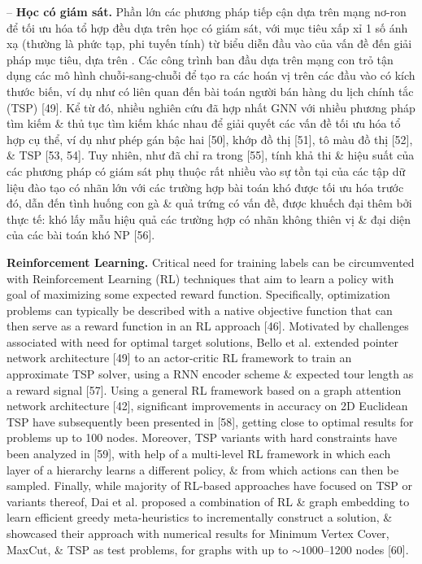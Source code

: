 \documentclass{article}
\begin{document}
\begin{itemize}
    -- {\bf Học có giám sát.} Phần lớn các phương pháp tiếp cận dựa trên mạng nơ-ron để tối ưu hóa tổ hợp đều dựa trên học có giám sát, với mục tiêu xấp xỉ 1 số ánh xạ (thường là phức tạp, phi tuyến tính) từ biểu diễn đầu vào của vấn đề đến giải pháp mục tiêu, dựa trên . Các công trình ban đầu dựa trên mạng con trỏ tận dụng các mô hình chuỗi-sang-chuỗi để tạo ra các hoán vị trên các đầu vào có kích thước biến, ví dụ như có liên quan đến bài toán người bán hàng du lịch chính tắc (TSP) [49]. Kể từ đó, nhiều nghiên cứu đã hợp nhất GNN với nhiều phương pháp tìm kiếm \& thủ tục tìm kiếm khác nhau để giải quyết các vấn đề tối ưu hóa tổ hợp cụ thể, ví dụ như phép gán bậc hai [50], khớp đồ thị [51], tô màu đồ thị [52], \& TSP [53, 54]. Tuy nhiên, như đã chỉ ra trong [55], tính khả thi \& hiệu suất của các phương pháp có giám sát phụ thuộc rất nhiều vào sự tồn tại của các tập dữ liệu đào tạo có nhãn lớn với các trường hợp bài toán khó được tối ưu hóa trước đó, dẫn đến tình huống con gà \& quả trứng có vấn đề, được khuếch đại thêm bởi thực tế: khó lấy mẫu hiệu quả các trường hợp có nhãn không thiên vị \& đại diện của các bài toán khó NP [56].

    {\bf Reinforcement Learning.} Critical need for training labels can be circumvented with Reinforcement Learning (RL) techniques that aim to learn a policy with goal of maximizing some expected reward function. Specifically, optimization problems can typically be described with a native objective function that can then serve as a reward function in an RL approach [46]. Motivated by challenges associated with need for optimal target solutions, Bello et al. extended pointer network architecture [49] to an actor-critic RL framework to train an approximate TSP solver, using a RNN encoder scheme \& expected tour length as a reward signal [57]. Using a general RL framework based on a graph attention network architecture [42], significant improvements in accuracy on 2D Euclidean TSP have subsequently been presented in [58], getting close to optimal results for problems up to 100 nodes. Moreover, TSP variants with hard constraints have been analyzed in [59], with help of a multi-level RL framework in which each layer of a hierarchy learns a different policy, \& from which actions can then be sampled. Finally, while majority of RL-based approaches have focused on TSP or variants thereof, Dai et al. proposed a combination of RL \& graph embedding to learn efficient greedy meta-heuristics to incrementally construct a solution, \& showcased their approach with numerical results for Minimum Vertex Cover, MaxCut, \& TSP as test problems, for graphs with up to $\sim1000$--1200 nodes [60].


\end{itemize}
\end{document}
